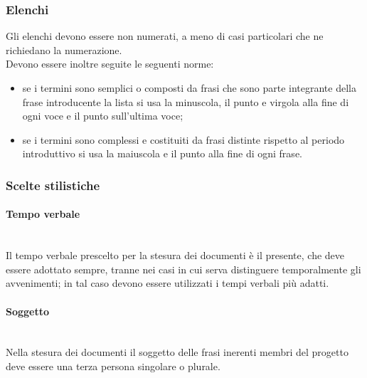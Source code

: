 \subsubsection{Elenchi}
Gli elenchi devono essere non numerati, a meno di casi particolari che ne richiedano la numerazione.\\
Devono essere inoltre seguite le seguenti norme:
\begin{itemize}
	\item se i termini sono semplici o composti da frasi che sono parte integrante della frase introducente la lista si usa la minuscola, il punto e virgola alla fine di ogni voce e il punto sull'ultima voce;
	\item se i termini sono complessi e costituiti da frasi distinte rispetto al periodo introduttivo si usa la maiuscola e il punto alla fine di ogni frase.
\end{itemize}

\subsubsection{Scelte stilistiche}

\paragraph{Tempo verbale} \mbox{} \\
Il tempo verbale prescelto per la stesura dei documenti è il presente, che deve essere adottato sempre, tranne nei casi in cui serva distinguere temporalmente gli avvenimenti; in tal caso devono essere utilizzati i tempi verbali più adatti.

\paragraph{Soggetto} \mbox{} \\
Nella stesura dei documenti il soggetto delle frasi inerenti membri del progetto deve essere una terza persona singolare o plurale.

